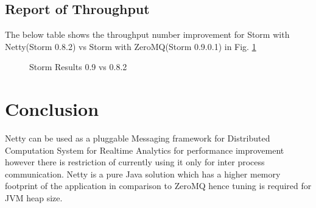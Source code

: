 \documentclass[9pt,twocolumn,twoside]{styles/osajnl}
\begin{document}
\subsection{Report of Throughput}
The below table shows the throughput number improvement for Storm with
Netty(Storm 0.8.2) vs Storm with ZeroMQ(Storm 0.9.0.1) in
Fig. \ref{fig:OfStreamsAndStorms}

\begin{figure}[htbp]
	\centering
	\caption{Storm Results 0.9 vs 0.8.2
          \cite{article-nabi2014streams}}
	\label{fig:OfStreamsAndStorms}
\end{figure}



\section{Conclusion}
Netty can be used as a pluggable Messaging framework for Distributed
Computation System for Realtime Analytics for performance improvement
however there is restriction of currently using it only for inter
process communication. Netty is a pure Java solution which has a
higher memory footprint of the application in comparison to ZeroMQ
hence tuning is required for JVM heap size.


 
\end{document}
